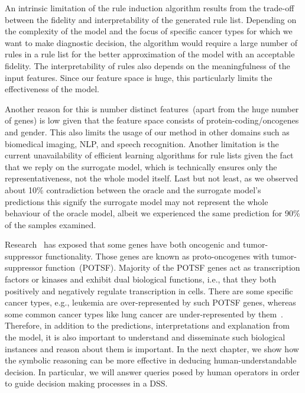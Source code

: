 \hspace*{3.5mm} An intrinsic limitation of the rule induction algorithm results from the trade-off between the fidelity and interpretability of the generated rule list. Depending on the complexity of the model and the focus of specific cancer types for which we want to make diagnostic decision, the algorithm would require a large number of rules in a rule list for the better  approximation of the model with an acceptable fidelity. The interpretability of rules also depends on the meaningfulness of the input features. Since our feature space is huge, this particularly limits the effectiveness of the model. 

\hspace*{3.5mm} Another reason for this is number distinct features~(apart from the huge number of genes) is low given that the feature space consists of protein-coding/oncogenes and gender. This also limits the usage of our method in other domains such as biomedical imaging, NLP, and speech recognition. Another limitation is the current unavailability of efficient learning algorithms for rule lists given the fact that we reply on the surrogate model, which is technically ensures only the representativeness, not the whole model itself. Last but not least, as we observed about 10\% contradiction between the oracle and the surrogate model's predictions this signify the surrogate model may not represent the whole behaviour of the oracle model, albeit we experienced the same prediction for 90\% of the samples examined. 

\hspace*{3.5mm} Research~\cite{POSTF} has exposed that some genes have both oncogenic and tumor-suppressor functionality. Those genes are known as proto-oncogenes with tumor-suppressor function~(POTSF). Majority of the POTSF genes act as transcription factors or kinases and exhibit dual biological functions, i.e., that they both positively and negatively regulate transcription in cells. There are some specific cancer types, e.g., leukemia are over-represented by such POTSF genes, whereas some common cancer types like lung cancer are under-represented by them~\cite{POSTF}. Therefore, in addition to the predictions, interpretations and explanation from the model, it is also important to understand and disseminate such biological instances and reason about them is important. In the next chapter, we show how the symbolic reasoning can be more effective in deducing human-understandable decision. In particular, we will answer queries posed by human operators in order to guide decision making processes in a DSS. 

